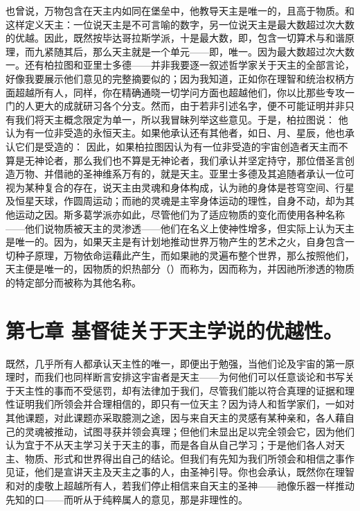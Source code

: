 也曾说，万物包含在天主内如同在堡垒中，他教导天主是唯一的，且高于物质。和这样定义天主：一位说天主是不可言喻的数字，另一位说天主是最大数超过次大数的优越。因此，既然按毕达哥拉斯学派，十是最大数，即，包含一切算术与和谐原理，而九紧随其后，那么天主就是一个单元——即，唯一。因为最大数超过次大数一。还有柏拉图和亚里士多德——并非我要逐一叙述哲学家关于天主的全部言论，好像我要展示他们意见的完整摘要似的；因为我知道，正如你在理智和统治权柄方面超越所有人，同样，你在精确通晓一切学问方面也超越他们，你以比那些专攻一门的人更大的成就研习各个分支。然而，由于若非引述名字，便不可能证明并非只有我们将天主概念限定为单一，所以我冒昧列举这些意见。于是，柏拉图说： 他认为有一位非受造的永恒天主。如果他承认还有其他者，如日、月、星辰，他也承认它们是受造的： 因此，如果柏拉图因认为有一位非受造的宇宙创造者天主而不算是无神论者，那么我们也不算是无神论者，我们承认并坚定持守，那位借圣言创造万物、并借祂的圣神维系万有的，就是天主。亚里士多德及其追随者承认一位可视为某种复合的存在，说天主由灵魂和身体构成，认为祂的身体是苍穹空间、行星及恒星天球，作圆周运动；而祂的灵魂是主宰身体运动的理性，自身不动，却为其他运动之因。斯多葛学派亦如此，尽管他们为了适应物质的变化而使用各种名称——他们说物质被天主的灵渗透——他们在名义上使神性增多，但实际上认为天主是唯一的。因为，如果天主是有计划地推动世界万物产生的艺术之火，自身包含一切种子原理，万物依命运藉此产生，而如果祂的灵遍布整个世界，那么按照他们，天主便是唯一的，因物质的炽热部分（）而称为，因而称为，并因祂所渗透的物质的特定部分而被称为其他名称。\par


\section{第七章 基督徒关于天主学说的优越性。}

既然，几乎所有人都承认天主性的唯一，即便出于勉强，当他们论及宇宙的第一原理时，而我们也同样断言安排这宇宙者是天主——为何他们可以任意谈论和书写关于天主性的事而不受惩罚，却有法律加于我们，尽管我们能以符合真理的证据和理性证明我们所领会并合理相信的，即只有一位天主？因为诗人和哲学家们，一如对其他课题，对此课题亦采取臆测之途，因与来自天主的灵感有某种亲和，各人藉自己的灵魂被推动，试图寻获并领会真理；但他们未显出足以完全领会它，因为他们认为宜于不从天主学习关于天主的事，而是各自从自己学习；于是他们各人对天主、物质、形式和世界得出自己的结论。但我们有先知为我们所领会和相信之事作见证，他们是宣讲天主及天主之事的人，由圣神引导。你也会承认，既然你在理智和对的虔敬上超越所有人，若我们停止相信来自天主的圣神——祂像乐器一样推动先知的口——而听从于纯粹属人的意见，那是非理性的。\par

